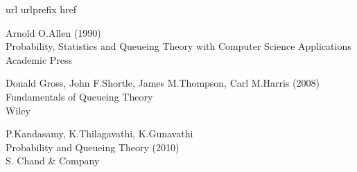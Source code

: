 \documentclass[a4paper,10pt]{scrartcl}
\theoremstyle{definition}
\numberwithin{equation}{section}
\begin{document}





\newpage
\begin{thebibliography}{10}
  \expandafter\ifx\csname url\endcsname\relax
  \def\url#1{\texttt{#1}}\fi
  \expandafter\ifx\csname urlprefix\endcsname\relax\def\urlprefix{URL }\fi
  \expandafter\ifx\csname href\endcsname\relax
  \def\href#1#2{#2} \def\path#1{#1}\fi

  Arnold O.Allen (1990)\\
  Probability, Statistics and Queueing Theory with Computer Science Applications\\
  Academic Press

  Donald Gross, John F.Shortle, James M.Thompson, Carl M.Harris (2008)\\
  Fundamentals of Queueing Theory\\
  Wiley
  
  P.Kandasamy, K.Thilagavathi, K.Gunavathi\\
  Probability and Queueing Theory (2010)\\
  S. Chand \& Company
\end{thebibliography}
\end{document}
